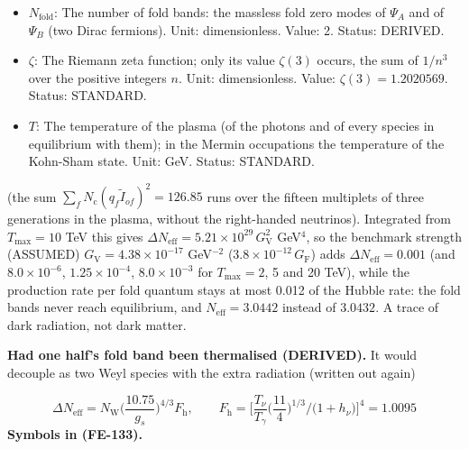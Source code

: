 \documentclass[
  10pt,
]{article}
\begin{document}
\begin{itemize}
  \(\mathcal{H} = \dot a_4\) (the Hubble rate of the observer; in the
  hot Universe
  \(\mathcal{H} = (8\pi^3g_\rho/90)^{1/2}T^2/M_{\mathrm{Pl}}\)). Unit:
  GeV. Status: DERIVED.
\item
  \(N_{\mathrm{fold}}\): The number of fold bands: the massless fold
  zero modes of \(\Psi_A\) and of \(\Psi_B\) (two Dirac fermions). Unit:
  dimensionless. Value: 2. Status: DERIVED.
\item
  \(\zeta\): The Riemann zeta function; only its value \(\zeta(3)\)
  occurs, the sum of \(1/n^3\) over the positive integers \(n\). Unit:
  dimensionless. Value: \(\zeta(3) = 1.2020569\). Status: STANDARD.
\item
  \(T\): The temperature of the plasma (of the photons and of every
  species in equilibrium with them); in the Mermin occupations the
  temperature of the Kohn-Sham state. Unit: GeV. Status: STANDARD.
\end{itemize}

(the sum \(\sum_fN_{\mathrm{c}}(q_f\tilde I_{of})^2 = 126.85\) runs over
the fifteen multiplets of three generations in the plasma, without the
right-handed neutrinos). Integrated from \(T_{\mathrm{max}} = 10\) TeV
this gives
\(\Delta N_{\mathrm{eff}} = 5.21\times10^{29}\,G_{\mathrm{V}}^2\)
GeV\(^4\), so the benchmark strength (ASSUMED)
\(G_{\mathrm{V}} = 4.38\times10^{-17}\) GeV\(^{-2}\)
(\(3.8\times10^{-12}\,G_{\mathrm{F}}\)) adds
\(\Delta N_{\mathrm{eff}} = 0.001\) (and \(8.0\times10^{-6}\),
\(1.25\times10^{-4}\), \(8.0\times10^{-3}\) for
\(T_{\mathrm{max}} = 2\), 5 and 20 TeV), while the production rate per
fold quantum stays at most 0.012 of the Hubble rate: the fold bands
never reach equilibrium, and \(N_{\mathrm{eff}} = 3.0442\) instead of
\(3.0432\). A trace of dark radiation, not dark matter.

\textbf{Had one half's fold band been thermalised (DERIVED).} It would
decouple as two Weyl species with the extra radiation (written out
again)

\[
\Delta N_{\mathrm{eff}} = N_{\mathrm{W}}\Big(\frac{10.75}{g_s}\Big)^{4/3}F_{\mathrm{h}},\qquad
F_{\mathrm{h}} = \Big[\frac{T_\nu}{T_\gamma}\Big(\frac{11}{4}\Big)^{1/3}\Big/\big(1 + h_\nu\big)\Big]^4
 = 1.0095 \tag{FE-133}
\] \textbf{Symbols in (FE-133).}
\end{document}
